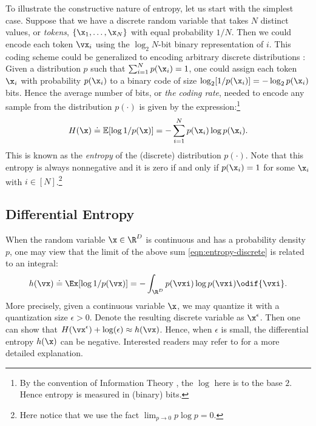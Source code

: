\documentclass[../../book-main.tex]{subfiles}
\begin{document}
To illustrate the constructive nature of entropy, let us start with the simplest case. Suppose that we have a discrete random variable that takes $N$ distinct values, or \textit{tokens}, $\{\x_1, \ldots, \x_N\}$ with equal probability $1/N$. Then we could encode each token \(\vx_{i}\) using the \(\log_2 N\)-bit binary representation of \(i\). This coding scheme could be generalized to encoding arbitrary discrete distributions \cite{Cover-Thomas}: Given a distribution \(p\) such that $\sum_{i=1}^N p(\x_i) = 1$, one could assign each token $\x_i$ with probability $p(\x_i)$ to a binary code of size $\log_2 [1/p(\x_i)] = - \log_2 p(\x_i)$ bits. Hence the average number of bits, or {\em the coding rate}, needed to encode any sample from the distribution $p(\cdot)$ is given by the expression:\footnote{By the convention of  Information Theory \cite{Cover-Thomas}, the $\log$ here is to the base $2$. Hence entropy is measured in (binary) bits.}
\begin{equation}
	H(\x) \doteq \mathbb{E}[\log 1/p(\x)]  = - \sum_{i=1}^N p(\x_i) \log  p(\x_i).
	\label{eqn:entropy-discrete}
\end{equation}
This is known as the {\em entropy} of the (discrete) distribution $p(\cdot)$. Note that this entropy is always nonnegative and it is zero if and only if $p(\x_i) = 1$ for some $\x_i$ with $i \in [N]$.\footnote{Here notice that we use the fact $\lim_{p\rightarrow 0} p \log p = 0$.}


\subsection{Differential Entropy}

When the random variable $\x \in \R^{D}$ is continuous and has a probability density $p$, one may view that the limit of the above sum \eqref{eqn:entropy-discrete} is related to an integral:
\begin{equation}
	h(\vx) \doteq \Ex[\log 1/p(\vx)] = - \int_{\R^{D}} p(\vxi) \log p(\vxi) \odif{\vxi}.
	\label{eqn:entropy-differential}
\end{equation}
{More precisely, given a continuous variable $\x$, we may quantize it with a quantization size $\epsilon > 0$. Denote the resulting discrete variable as $\x^\epsilon$. Then one can show that $H(\vx^\epsilon) + \log(\epsilon) \approx h(\vx)$. Hence, when $\epsilon$ is small, the differential entropy $h(\x)$ can be negative. Interested readers may refer to \cite{Cover-Thomas} for a more detailed explanation.}
\end{document}
